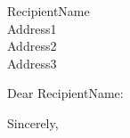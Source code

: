 \documentclass[letterpaper,11pt]{letter}
\begin{document}
\begin{letter}{RecipientName \\ Address1 \\ Address2 \\ Address3}

\opening{Dear RecipientName:}

\lipsum[1-2]

\closing{Sincerely,} %


\end{letter}
\end{document}
